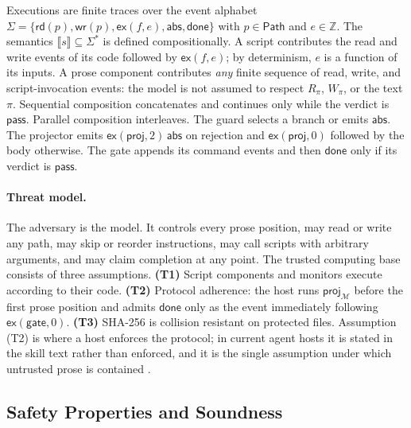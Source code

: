 \documentclass[11pt]{article}
\theoremstyle{definition}
\theoremstyle{plain}
\newcommand{\Mcal}{\mathcal{M}}
\newcommand{\pass}{\mathsf{pass}}
\newcommand{\sem}[1]{\llbracket #1 \rrbracket}
\newcommand{\gate}{\mathsf{gate}}
\newcommand{\proj}{\mathsf{proj}}
\newcommand{\ex}{\mathsf{ex}}
\newcommand{\rd}{\mathsf{rd}}
\newcommand{\wrt}{\mathsf{wr}}
\newcommand{\done}{\mathsf{done}}
\newcommand{\abs}{\mathsf{abs}}
\newcommand{\Paths}{\mathsf{Path}}
\begin{document}
Executions are finite traces over the event alphabet $\Sigma = \{\rd(p), \wrt(p), \ex(f, e), \abs, \done\}$ with $p \in \Paths$ and $e \in \mathbb{Z}$. The semantics $\sem{s} \subseteq \Sigma^{*}$ is defined compositionally. A script contributes the read and write events of its code followed by $\ex(f, e)$; by determinism, $e$ is a function of its inputs. A prose component contributes \emph{any} finite sequence of read, write, and script-invocation events: the model is not assumed to respect $R_\pi$, $W_\pi$, or the text $\pi$. Sequential composition concatenates and continues only while the verdict is $\pass$. Parallel composition interleaves. The guard selects a branch or emits $\abs$. The projector emits $\ex(\proj, 2)\,\abs$ on rejection and $\ex(\proj, 0)$ followed by the body otherwise. The gate appends its command events and then $\done$ only if its verdict is $\pass$.

\paragraph{Threat model.} The adversary is the model. It controls every prose position, may read or write any path, may skip or reorder instructions, may call scripts with arbitrary arguments, and may claim completion at any point. The trusted computing base consists of three assumptions. \textbf{(T1)} Script components and monitors execute according to their code. \textbf{(T2)} Protocol adherence: the host runs $\proj_{\Mcal}$ before the first prose position and admits $\done$ only as the event immediately following $\ex(\gate, 0)$. \textbf{(T3)} SHA-256 is collision resistant on protected files. Assumption (T2) is where a host enforces the protocol; in current agent hosts it is stated in the skill text rather than enforced, and it is the single assumption under which untrusted prose is contained \citep{alshiekh2018safe}.

\subsection{Safety Properties and Soundness}
\label{subsec:safety}
\end{document}
